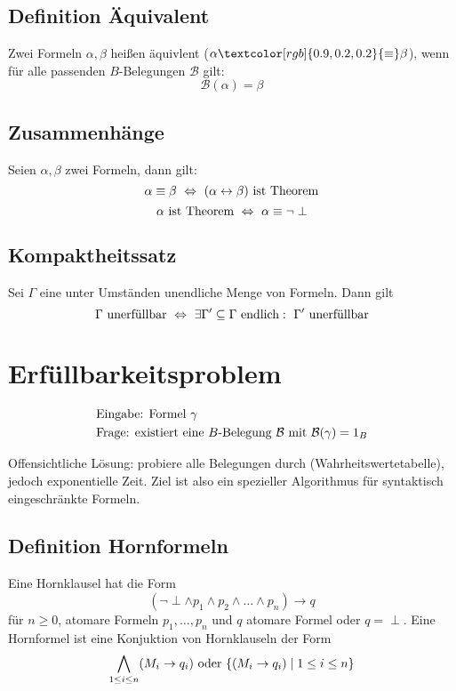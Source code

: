 \documentclass[12pt,a4paper]{report}
\newcommand{\ra}{\rightarrow}
\newcommand{\ls}{\newline\newline}
\newcommand{\red}[1]{\textcolor[rgb]{0.9,0.2,0.2}{#1}}
\newcommand{\green}[1]{\textcolor[rgb]{0.1,0.6,0.1}{#1}}
\newcommand{\blue}[1]{\textcolor[rgb]{0.2,0.2,1}{#1}}
\begin{document}
\subsection{\blue{Definition Äquivalent}}
Zwei Formeln $ \alpha, \beta $ heißen \red{äquivlent} ($ \alpha \red{\equiv} \beta $), wenn für alle passenden $ B $-Belegungen $ \mathcal{B} $ gilt:
\[
    \mathcal{B}(\alpha) = \mathcal{\beta}
\]
\subsection{\green{Zusammenhänge}}
Seien $ \alpha, \beta $ zwei Formeln, dann gilt:
\[
    \alpha \equiv \beta ~\Leftrightarrow~ (\alpha \leftrightarrow \beta) \textnormal{ ist Theorem}
\]
\[
    \alpha \textnormal{ ist Theorem} ~\Leftrightarrow~ \alpha \equiv \lnot\perp
\]
\subsection{\green{Kompaktheitssatz}}
Sei $ \Gamma $ eine unter Umständen unendliche Menge von Formeln. Dann gilt
\[
    \Gamma \textnormal{ unerfüllbar} ~\Leftrightarrow~ \exists \Gamma' \subseteq \Gamma \textnormal{ endlich}:~ \Gamma' \textnormal{ unerfüllbar}
\]
\section{\blue{Erfüllbarkeitsproblem}}
\begin{center}
    \begin{align*}
        &\textnormal{Eingabe: Formel } \gamma\\
        &\textnormal{Frage: existiert eine $ B $-Belegung $ \mathcal{B} $ mit $ \mathcal{B}(\gamma) = 1_B$}
    \end{align*}
\end{center}
Offensichtliche Lösung: probiere alle Belegungen durch (Wahrheitswertetabelle), jedoch exponentielle Zeit. Ziel ist also ein spezieller Algorithmus für syntaktisch eingeschränkte Formeln.
\subsection{\blue{Definition Hornformeln}}
Eine \red{Hornklausel} hat die Form
\[
    (\lnot \perp \wedge p_1 \wedge p_2 \wedge \dots \wedge p_n) \ra q
\]
für $ n \geq 0 $, atomare Formeln $ p_1,\dots,p_n $ und $ q $ atomare Formel oder $ q = \perp $.\ls
Eine \red{Hornformel} ist eine Konjuktion von Hornklauseln der Form
\[
    \bigwedge_{1 \leq i \leq n} (M_i \ra q_i) \textnormal{ oder } \{(M_i \ra q_i) \mid 1 \leq i \leq n\}
\]
\end{document}
